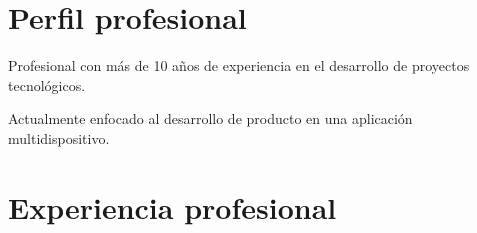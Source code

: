 \documentclass[letterpaper]{twentysecondcv} %
\begin{document}
\makeprofile %

\section{Perfil profesional}
Profesional con más de 10 años de experiencia en el desarrollo de proyectos tecnológicos.

Actualmente enfocado al desarrollo de producto en una aplicación multidispositivo.

\section{Experiencia profesional}
\end{document}
